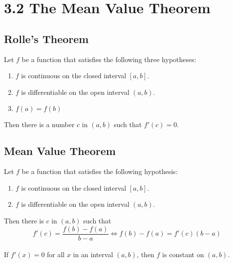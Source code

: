 %
%

\section*{3.2 The Mean Value Theorem}

\subsection*{Rolle's Theorem}

Let \(f\) be a function that satisfies the following three hypotheses:
\begin{enumerate}
    \item \(f\) is continuous on the closed interval \([a, b]\).
    \item \(f\) is differentiable on the open interval \((a, b)\).
    \item \(f(a)=f(b)\)
\end{enumerate}
Then there is a number \(c\) in \((a, b)\) such that \(f'(c)=0\).

\subsection*{Mean Value Theorem}

Let \(f\) be a function that satisfies the following hypothesis:
\begin{enumerate}
    \item \(f\) is continuous on the closed interval \([a, b]\).
    \item \(f\) is differentiable on the open interval \((a, b)\).
\end{enumerate}
Then there is \(c\) in \((a, b)\) such that
$$f'(c)=\frac{f(b)-f(a)}{b-a} \Leftrightarrow f(b)-f(a)=f'(c)(b-a)$$
\\
If \(f'(x)=0\) for all \(x\) in an interval \((a, b)\), then \(f\) is constant on \((a, b)\).
